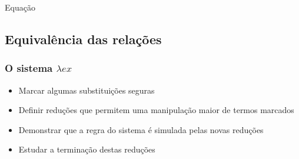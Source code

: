 \documentclass{beamer}
\begin{document}
\begin{frame}{Equação}


    
\end{frame}


\subsection{Equivalência das relações}

\begin{frame}
\frametitle{O sistema $\lambda ex$}

\begin{itemize}
    \item Marcar algumas substituições seguras
    \item Definir reduções que permitem uma manipulação maior de termos marcados
    \item Demonstrar que a regra do sistema é simulada pelas novas reduções
    \item Estudar a terminação destas reduções
\end{itemize}
    
\end{frame}

\end{document}
